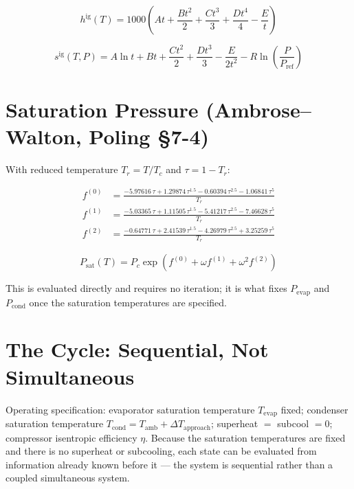 \documentclass[11pt]{article}
\begin{document}
\begin{equation}
h^{\text{ig}}(T) = 1000\left(At + \frac{Bt^2}{2} + \frac{Ct^3}{3}
+ \frac{Dt^4}{4} - \frac{E}{t}\right)
\end{equation}

\begin{equation}
s^{\text{ig}}(T,P) = A\ln t + Bt + \frac{Ct^2}{2} + \frac{Dt^3}{3}
- \frac{E}{2t^2} - R\ln\!\left(\frac{P}{P_{\text{ref}}}\right)
\end{equation}

\section{Saturation Pressure (Ambrose--Walton, Poling \S7-4)}

With reduced temperature $T_r = T/T_c$ and $\tau = 1 - T_r$:

\begin{align}
f^{(0)} &= \frac{-5.97616\,\tau + 1.29874\,\tau^{1.5} - 0.60394\,\tau^{2.5}
- 1.06841\,\tau^5}{T_r} \\
f^{(1)} &= \frac{-5.03365\,\tau + 1.11505\,\tau^{1.5} - 5.41217\,\tau^{2.5}
- 7.46628\,\tau^5}{T_r} \\
f^{(2)} &= \frac{-0.64771\,\tau + 2.41539\,\tau^{1.5} - 4.26979\,\tau^{2.5}
+ 3.25259\,\tau^5}{T_r}
\end{align}

\begin{equation}
P_{\text{sat}}(T) = P_c \exp\!\left(f^{(0)} + \omega f^{(1)} + \omega^2 f^{(2)}\right)
\end{equation}

This is evaluated directly and requires no iteration; it is what fixes
$P_{\text{evap}}$ and $P_{\text{cond}}$ once the saturation temperatures are
specified.

\section{The Cycle: Sequential, Not Simultaneous}

Operating specification: evaporator saturation temperature $T_{\text{evap}}$
fixed; condenser saturation temperature $T_{\text{cond}} = T_{\text{amb}} +
\Delta T_{\text{approach}}$; superheat $= $ subcool $= 0$; compressor
isentropic efficiency $\eta$. Because the saturation temperatures are fixed
and there is no superheat or subcooling, each state can be evaluated from
information already known before it --- the system is sequential rather
than a coupled simultaneous system.
\end{document}
